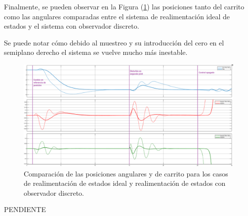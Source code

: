 Finalmente, se pueden observar en la Figura (\ref{fig:disc_vs_ideal_vars}) las posiciones tanto del carrito como las angulares comparadas entre el sistema de realimentación ideal de estados y el sistema con observador discreto. 

Se puede notar cómo debido al muestreo y su introducción del cero en el semiplano derecho el sistema se vuelve mucho más inestable.

\begin{figure}[H]
	\centering
	\includegraphics[width=\linewidth]{../Analisis de Resultados/ImagenesAnalisis de Resultados/disc_vs_ideal_vars.png}
	\caption{Comparación de las posiciones angulares y de carrito para los casos de realimentación de estados ideal y realimentación de estados con observador discreto.}	
	\label{fig:disc_vs_ideal_vars}
\end{figure}

PENDIENTE

